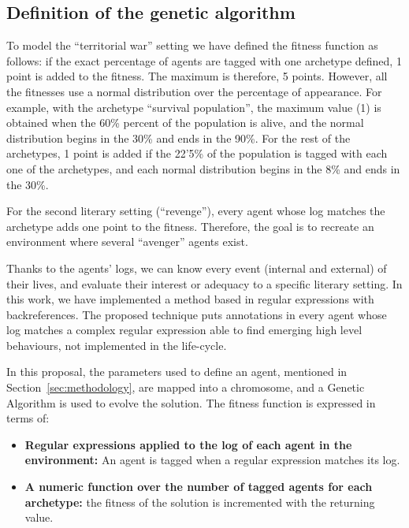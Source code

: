 \documentclass[letterpaper]{article}
\begin{document}
\subsection{Definition of  the genetic algorithm}


To model the ``territorial war'' setting we have defined the fitness function as follows: if the exact percentage of agents are tagged with one archetype defined, 1 point is added to the fitness. The maximum is therefore, 5 points. However, all the fitnesses use a normal distribution over the percentage of appearance. For example, with the archetype ``survival population'', the maximum value (1) is obtained when the 60\% percent of the population is alive, and the normal distribution begins in the 30\% and ends in the 90\%. For the rest of the archetypes, 1 point is added if the 22'5\% of the population is tagged with each one of the archetypes, and each normal distribution begins in the 8\% and ends in the 30\%.

For the second literary setting (``revenge''), every agent whose log matches the archetype adds one point to the fitness. Therefore, the goal is to recreate an environment where several ``avenger'' agents exist.

Thanks to the agents' logs, we can know every event (internal and
external) of their lives, and evaluate their interest or
adequacy to a specific literary setting.
In this work, we have implemented a method based in regular expressions with backreferences. The proposed technique puts annotations in every agent whose log matches a complex regular expression able to find emerging high level behaviours, not implemented in the life-cycle.

In this proposal, the parameters used to define an agent, mentioned in Section~\ref{sec:methodology}, are mapped into a chromosome, and a Genetic Algorithm is used to evolve the solution. The fitness function is expressed in terms of:

\begin{itemize}
\item \textbf{Regular expressions applied to the log of each agent in the environment:} An agent is tagged when a regular expression matches its log.
\item \textbf{A numeric function over the number of tagged agents for each archetype:} the fitness of the solution is incremented with the returning value.
\end{itemize}
\end{document}
